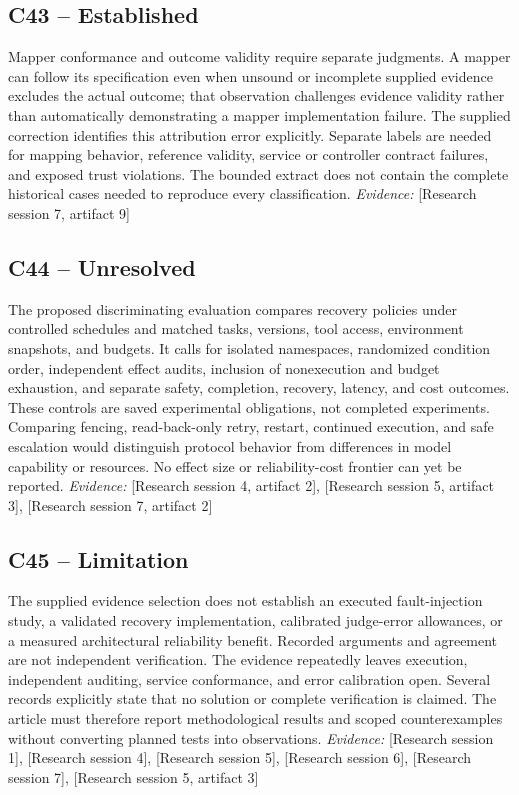 \documentclass[11pt]{article}
\begin{document}
\subsection{C43 -- Established}
Mapper conformance and outcome validity require separate judgments. A mapper can follow its specification even when unsound or incomplete supplied evidence excludes the actual outcome; that observation challenges evidence validity rather than automatically demonstrating a mapper implementation failure.
The supplied correction identifies this attribution error explicitly. Separate labels are needed for mapping behavior, reference validity, service or controller contract failures, and exposed trust violations. The bounded extract does not contain the complete historical cases needed to reproduce every classification.
\textit{Evidence: }[Research session 7, artifact 9]
\subsection{C44 -- Unresolved}
The proposed discriminating evaluation compares recovery policies under controlled schedules and matched tasks, versions, tool access, environment snapshots, and budgets. It calls for isolated namespaces, randomized condition order, independent effect audits, inclusion of nonexecution and budget exhaustion, and separate safety, completion, recovery, latency, and cost outcomes.
These controls are saved experimental obligations, not completed experiments. Comparing fencing, read-back-only retry, restart, continued execution, and safe escalation would distinguish protocol behavior from differences in model capability or resources. No effect size or reliability-cost frontier can yet be reported.
\textit{Evidence: }[Research session 4, artifact 2], [Research session 5, artifact 3], [Research session 7, artifact 2]
\subsection{C45 -- Limitation}
The supplied evidence selection does not establish an executed fault-injection study, a validated recovery implementation, calibrated judge-error allowances, or a measured architectural reliability benefit. Recorded arguments and agreement are not independent verification.
The evidence repeatedly leaves execution, independent auditing, service conformance, and error calibration open. Several records explicitly state that no solution or complete verification is claimed. The article must therefore report methodological results and scoped counterexamples without converting planned tests into observations.
\textit{Evidence: }[Research session 1], [Research session 4], [Research session 5], [Research session 6], [Research session 7], [Research session 5, artifact 3]
\end{document}
